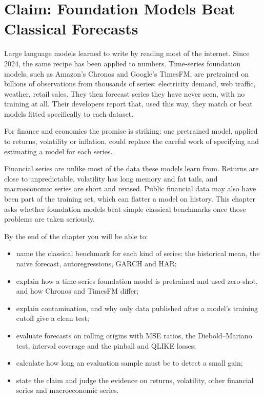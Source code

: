 \makeatletter
{}
\makeatother

\chapter{Claim: Foundation Models Beat Classical Forecasts}
\label{ch:22}

Large language models learned to write by reading most of the internet. Since 2024, the same recipe has been applied to numbers. Time-series foundation models, such as Amazon's Chronos and Google's TimesFM, are pretrained on billions of observations from thousands of series: electricity demand, web traffic, weather, retail sales. They then forecast series they have never seen, with no training at all. Their developers report that, used this way, they match or beat models fitted specifically to each dataset.

For finance and economics the promise is striking: one pretrained model, applied to returns, volatility or inflation, could replace the careful work of specifying and estimating a model for each series.

Financial series are unlike most of the data these models learn from. Returns are close to unpredictable, volatility has long memory and fat tails, and macroeconomic series are short and revised. Public financial data may also have been part of the training set, which can flatter a model on history. This chapter asks whether foundation models beat simple classical benchmarks once those problems are taken seriously.

By the end of the chapter you will be able to:

\begin{itemize}
  \item name the classical benchmark for each kind of series: the historical mean, the naive forecast, autoregressions, GARCH and HAR;
  \item explain how a time-series foundation model is pretrained and used zero-shot, and how Chronos and TimesFM differ;
  \item explain contamination, and why only data published after a model's training cutoff give a clean test;
  \item evaluate forecasts on rolling origins with MSE ratios, the Diebold--Mariano test, interval coverage and the pinball and QLIKE losses;
  \item calculate how long an evaluation sample must be to detect a small gain;
  \item state the claim and judge the evidence on returns, volatility, other financial series and macroeconomic series.
\end{itemize}

